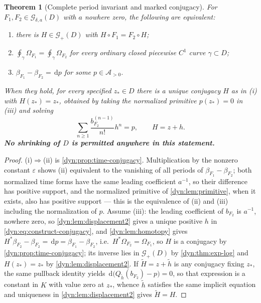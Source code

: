 \documentclass[11pt,letterpaper]{article}
\newtheorem{theorem}{Theorem}[section]
\theoremstyle{definition}
\theoremstyle{remark}
\newcommand{\GG}{\mathscr G}
\newcommand{\AAA}{\mathscr A}
\newcommand{\eps}{\varepsilon}
\newcommand{\dd}{\,\mathrm d}
\numberwithin{equation}{section}
\begin{document}
\begin{theorem}[Complete period invariant and marked conjugacy]
\label{dyn:thm:classification}
For $F_1,F_2\in\GG_{\delta,a}(D)$ with $a$ nowhere zero, the following are
equivalent:
\begin{enumerate}[label=(\roman*)]
\item there is $H\in\GG_+(D)$ with $H\circ F_1=F_2\circ H$;
\item $\oint_\gamma\Omega_{F_1}=\oint_\gamma\Omega_{F_2}$ for every
ordinary closed piecewise $C^{1}$ curve $\gamma\subset D$;
\item $\beta_{F_1}-\beta_{F_2}=\dd p$ for some $p\in\AAA_{>0}$.
\end{enumerate}
When they hold, for every specified $z_{*}\in D$ there is a \emph{unique}
conjugacy $H$ as in (i) with $H(z_{*})=z_{*}$, obtained by taking the
normalized primitive $p(z_{*})=0$ in (iii) and solving
\begin{equation}\label{dyn:eq:construct-conjugacy}
 \sum_{n\ge1}\frac{b_{F_2}^{(n-1)}}{n!}h^{n}=p,\qquad H=z+h .
\end{equation}
\textbf{No shrinking of $D$ is permitted anywhere in this statement.}
\end{theorem}
\begin{proof}
(i)$\Rightarrow$(ii) is \cref{dyn:prop:time-conjugacy}. Multiplication by
the nonzero constant $\eps$ shows (ii) equivalent to the vanishing of all
periods of $\beta_{F_1}-\beta_{F_2}$; both normalized time forms have the
same leading coefficient $a^{-1}$, so their difference has positive
support, and the normalized primitive of \cref{dyn:lem:primitive}, when it
exists, also has positive support --- this is the equivalence of (ii) and
(iii) including the normalization of $p$. Assume (iii): the leading
coefficient of $b_{F_2}$ is $a^{-1}$, nowhere zero, so
\cref{dyn:lem:displacement2} gives a unique positive $h$ in
\eqref{dyn:eq:construct-conjugacy}, and \cref{dyn:lem:homotopy} gives
$H^{*}\beta_{F_2}-\beta_{F_2}=\dd p=\beta_{F_1}-\beta_{F_2}$, i.e.\
$H^{*}\Omega_{F_2}=\Omega_{F_1}$, so $H$ is a conjugacy by
\cref{dyn:prop:time-conjugacy}; its inverse lies in $\GG_+(D)$ by
\cref{dyn:thm:exp-log} and $H(z_{*})=z_{*}$ by
\cref{dyn:lem:displacement2}. If $\widetilde H=z+\widetilde h$ is any
conjugacy fixing $z_{*}$, the same pullback identity yields
$\dd\bigl(Q_{\widetilde h}(b_{F_2})-p\bigr)=0$, so that expression is a
constant in $K$ with value zero at $z_{*}$, whence $\widetilde h$ satisfies
the same implicit equation and uniqueness in
\cref{dyn:lem:displacement2} gives $\widetilde H=H$.
\end{proof}
\end{document}

